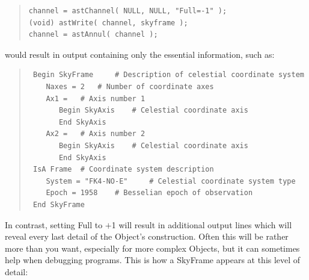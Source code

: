 \documentclass[twoside,11pt]{article}
\newcommand{\htmlref}[2]{#1}
\begin{document}
\begin{quote}
\small
\begin{verbatim}
channel = astChannel( NULL, NULL, "Full=-1" );
(void) astWrite( channel, skyframe );
channel = astAnnul( channel );
\end{verbatim}
\normalsize
\end{quote}

would result in output containing only the essential information, such
as:

\begin{quote}
\small
\begin{verbatim}
 Begin SkyFrame 	# Description of celestial coordinate system
    Naxes = 2 	# Number of coordinate axes
    Ax1 = 	# Axis number 1
       Begin SkyAxis 	# Celestial coordinate axis
       End SkyAxis
    Ax2 = 	# Axis number 2
       Begin SkyAxis 	# Celestial coordinate axis
       End SkyAxis
 IsA Frame 	# Coordinate system description
    System = "FK4-NO-E" 	# Celestial coordinate system type
    Epoch = 1958 	# Besselian epoch of observation
 End SkyFrame
\end{verbatim}
\normalsize
\end{quote}

In contrast, setting Full to $+$1 will result in additional output
lines which will reveal every last detail of the \htmlref{Object}{Object}'s
construction. Often this will be rather more than you want, especially
for more complex Objects, but it can sometimes help when debugging
programs. This is how a \htmlref{SkyFrame}{SkyFrame} appears at this level of detail:
\end{document}
